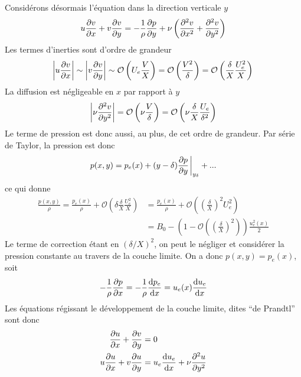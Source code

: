       Considérons désormais l'équation dans la direction verticale $y$
      \begin{equation}
        u\pdv{v}{x} + v \pdv{v}{y} = -\frac{1}{\rho}\pdv{p}{y} + \nu \left(\pdv[2]{v}{x} + \pdv[2]{v}{y}\right)
      \end{equation}
      Les termes d'inerties sont d'ordre de grandeur
      \begin{equation}
        \left|u \pdv{v}{x} \right| \sim \left|v\pdv{v}{y}\right| \sim \mathcal{O}\left(U_e \frac{V}{X} \right) =
        \mathcal{O}\left(\frac{V^2}{\delta}\right) = \mathcal{O}\left(\frac{\delta}{X}\frac{U_e^2}{X}\right)\\
      \end{equation}
      La diffusion est négligeable en $x$ par rapport à $y$
      \begin{equation}
        \left| \nu \pdv[2]{v}{y} \right| = \mathcal{O}\left(\nu \frac{V}{\delta}\right) = \mathcal{O}\left(\nu \frac{\delta}{X}\frac{U_e}{\delta^2}\right)
      \end{equation}
      Le terme de pression est donc aussi, au plus, de cet ordre de grandeur. Par série de Taylor, la pression est donc
      \begin{equation}
        p(x, y) = p_e(x) + (y-\delta) \pdv{p}{y}\eval_{y_\delta} + ...
      \end{equation}
      ce qui donne
      \begin{equation}
        \begin{aligned}
          \frac{p(x,y)}{\rho} = \frac{p_e(x)}{\rho} + \mathcal{O}\left(\delta \frac{\delta}{X}\frac{U_e^2}{X}\right) &= \frac{p_e(x)}{\rho} + \mathcal{O}\left(\left(\frac{\delta}{X}\right)^2 U_e^2\right)\\
          &= B_0 - \left(1 - \mathcal{O}\left(\left(\frac{\delta}{X}\right)^2\right)\right) \frac{u_e^2(x)}{2}
        \end{aligned}
      \end{equation}
      Le terme de correction étant en $(\delta/X)^2$, on peut le négliger et considérer la pression constante au travers de la couche limite. On a donc $p(x, y) = p_e(x)$, soit
      \begin{equation}
        -\frac{1}{\rho} \pdv{p}{x} = -\frac{1}{\rho}\dv{p_e}{x}(x) = u_e(x) \dv{u_e}{x}(x)
      \end{equation}
      Les équations régissant le développement de la couche limite, dites ``de Prandtl'' sont donc
      \begin{equation}
        \begin{aligned}
          \pdv{u}{x} + \pdv{v}{y} &= 0\\
          u \pdv{u}{x} + v \pdv{u}{y} &= u_e \dv{u_e}{x} + \nu \pdv[2]{u}{y}
        \end{aligned}
      \end{equation}
